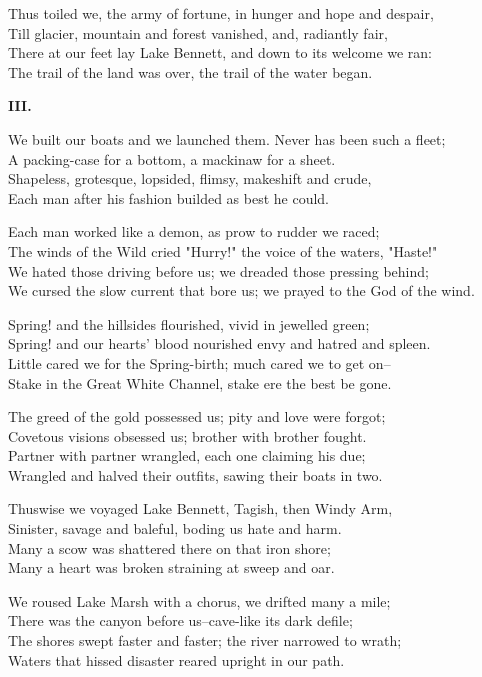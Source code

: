 \begin{poemblock}
Thus toiled we, the army of fortune, in hunger and hope and despair,\\
Till glacier, mountain and forest vanished, and, radiantly fair,\\
There at our feet lay Lake Bennett, and down to its welcome we ran:\\
The trail of the land was over, the trail of the water began.

\textbf{III.}

We built our boats and we launched them.  Never has been such a fleet;\\
A packing-case for a bottom, a mackinaw for a sheet.\\
Shapeless, grotesque, lopsided, flimsy, makeshift and crude,\\
Each man after his fashion builded as best he could.

Each man worked like a demon, as prow to rudder we raced;\\
The winds of the Wild cried "Hurry!" the voice of the waters, "Haste!"\\
We hated those driving before us; we dreaded those pressing behind;\\
We cursed the slow current that bore us; we prayed to the God of the wind.

Spring! and the hillsides flourished, vivid in jewelled green;\\
Spring! and our hearts' blood nourished envy and hatred and spleen.\\
Little cared we for the Spring-birth; much cared we to get on--\\
Stake in the Great White Channel, stake ere the best be gone.

The greed of the gold possessed us; pity and love were forgot;\\
Covetous visions obsessed us; brother with brother fought.\\
Partner with partner wrangled, each one claiming his due;\\
Wrangled and halved their outfits, sawing their boats in two.

Thuswise we voyaged Lake Bennett, Tagish, then Windy Arm,\\
Sinister, savage and baleful, boding us hate and harm.\\
Many a scow was shattered there on that iron shore;\\
Many a heart was broken straining at sweep and oar.

We roused Lake Marsh with a chorus, we drifted many a mile;\\
There was the canyon before us--cave-like its dark defile;\\
The shores swept faster and faster; the river narrowed to wrath;\\
Waters that hissed disaster reared upright in our path.


\end{poemblock}
